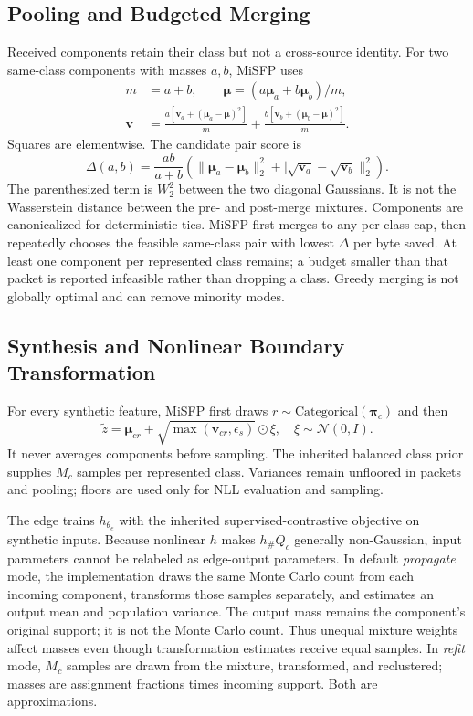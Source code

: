 \subsection{Pooling and Budgeted Merging}
Received components retain their class but not a cross-source identity. For two same-class components with masses $a,b$, MiSFP uses
\begin{align}
m&=a+b,\qquad \bm\mu=(a\bm\mu_a+b\bm\mu_b)/m,\label{eq:poolmean}\\
\bm v&=\frac{a[\bm v_a+(\bm\mu_a-\bm\mu)^2]}{m}
+\frac{b[\bm v_b+(\bm\mu_b-\bm\mu)^2]}{m}.\label{eq:poolvar}
\end{align}
Squares are elementwise. The candidate pair score is
\begin{equation}\label{eq:mergecost}
\Delta(a,b)=\frac{ab}{a+b}\left(\|\bm\mu_a-\bm\mu_b\|_2^2+|\sqrt{\bm v_a}-\sqrt{\bm v_b}\|_2^2\right).
\end{equation}
The parenthesized term is $W_2^2$ between the two diagonal Gaussians. It is not the Wasserstein distance between the pre- and post-merge mixtures. Components are canonicalized for deterministic ties. MiSFP first merges to any per-class cap, then repeatedly chooses the feasible same-class pair with lowest $\Delta$ per byte saved. At least one component per represented class remains; a budget smaller than that packet is reported infeasible rather than dropping a class. Greedy merging is not globally optimal and can remove minority modes.

\subsection{Synthesis and Nonlinear Boundary Transformation}
For every synthetic feature, MiSFP first draws $r\sim\mathrm{Categorical}(\bm\pi_c)$ and then
\begin{equation}
 \tilde z=\bm\mu_{cr}+\sqrt{\max(\bm v_{cr},\epsilon_s)}\odot\xi,\quad\xi\sim\mathcal N(0,I).
\end{equation}
It never averages components before sampling. The inherited balanced class prior supplies $M_c$ samples per represented class. Variances remain unfloored in packets and pooling; floors are used only for NLL evaluation and sampling.

The edge trains $h_{\theta_e}$ with the inherited supervised-contrastive objective on synthetic inputs. Because nonlinear $h$ makes $h_\#Q_c$ generally non-Gaussian, input parameters cannot be relabeled as edge-output parameters. In default \emph{propagate} mode, the implementation draws the same Monte Carlo count from each incoming component, transforms those samples separately, and estimates an output mean and population variance. The output mass remains the component's original support; it is not the Monte Carlo count. Thus unequal mixture weights affect masses even though transformation estimates receive equal samples. In \emph{refit} mode, $M_c$ samples are drawn from the mixture, transformed, and reclustered; masses are assignment fractions times incoming support. Both are approximations.

